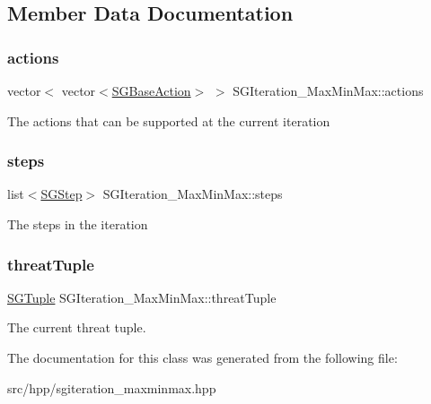 \subsection{Member Data Documentation}
\mbox{\label{classSGIteration__MaxMinMax_a0f6a9b1c5590ba858e154f365c09b472}} 
\subsubsection{\texorpdfstring{actions}{actions}}
{\footnotesize\ttfamily vector$<$ vector$<$\hyperlink{classSGBaseAction}{S\+G\+Base\+Action}$>$ $>$ S\+G\+Iteration\+\_\+\+Max\+Min\+Max\+::actions\hspace{0.3cm}{\ttfamily [private]}}

The actions that can be supported at the current iteration \mbox{\label{classSGIteration__MaxMinMax_aba082a06c4a9bf9c1f1dcc70ae159838}} 
\subsubsection{\texorpdfstring{steps}{steps}}
{\footnotesize\ttfamily list$<$\hyperlink{classSGStep}{S\+G\+Step}$>$ S\+G\+Iteration\+\_\+\+Max\+Min\+Max\+::steps\hspace{0.3cm}{\ttfamily [private]}}

The steps in the iteration \mbox{\label{classSGIteration__MaxMinMax_a095e196445f8ade3f0da2715b2337cae}} 
\subsubsection{\texorpdfstring{threat\+Tuple}{threatTuple}}
{\footnotesize\ttfamily \hyperlink{classSGTuple}{S\+G\+Tuple} S\+G\+Iteration\+\_\+\+Max\+Min\+Max\+::threat\+Tuple\hspace{0.3cm}{\ttfamily [private]}}

The current threat tuple. 

The documentation for this class was generated from the following file\+:\begin{DoxyCompactItemize}
\item 
src/hpp/sgiteration\+\_\+maxminmax.\+hpp\end{DoxyCompactItemize}
